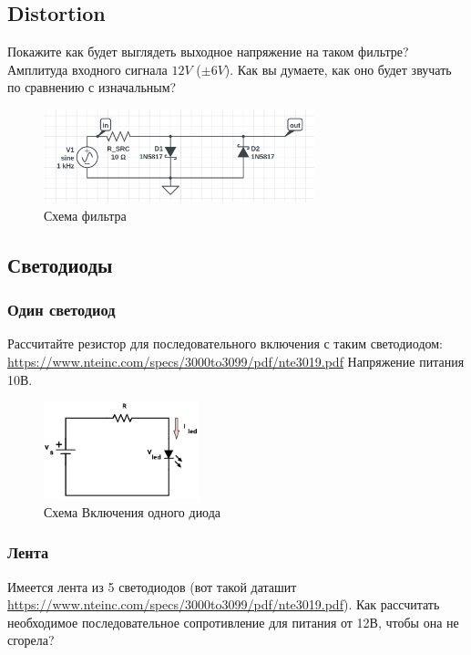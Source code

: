 \documentclass[a4paper,12pt]{article} %
\begin{document}
  \subsection{Distortion}
  Покажите как будет выглядеть выходное напряжение на таком фильтре? Амплитуда входного сигнала $ 12V$ ($ \pm 6V$). Как вы думаете, как оно будет звучать по сравнению с изначальным?
  \begin{figure}[H]
  \centering
  \includegraphics[width=0.7\textwidth]{task1.png}
  \caption{Схема фильтра}
  \end{figure}


  \subsection{Светодиоды}

  \subsubsection{Один светодиод}
  Рассчитайте резистор для последовательного включения с таким светодиодом: \url{https://www.nteinc.com/specs/3000to3099/pdf/nte3019.pdf} Напряжение питания 10В.

  \begin{figure}[H]
  \centering
  \includegraphics[width=0.4\textwidth]{external.png}
  \caption{Схема Включения одного диода}
  \end{figure}

  \subsubsection{Лента}
  Имеется лента из 5 светодиодов (вот такой даташит \url{https://www.nteinc.com/specs/3000to3099/pdf/nte3019.pdf}). Как рассчитать необходимое последовательное сопротивление для питания от 12В, чтобы она не сгорела?
\end{document}

